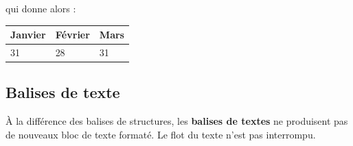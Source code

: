 \documentclass[a4paper,17pt]{extarticle}
\begin{document}
\begin{reponse}
qui donne alors :

\begin{longtable}[]{@{}lll@{}}
\toprule
Janvier & Février & Mars\tabularnewline
\midrule
\endhead
31 & 28 & 31\tabularnewline
\bottomrule
\end{longtable}

            \end{reponse}
    \hypertarget{balises-de-texte}{%
\subsection{Balises de texte}\label{balises-de-texte}}

    À la différence des balises de structures, les \textbf{balises de
textes} ne produisent pas de nouveaux bloc de texte formaté. Le flot du
texte n'est pas interrompu.
\end{document}
